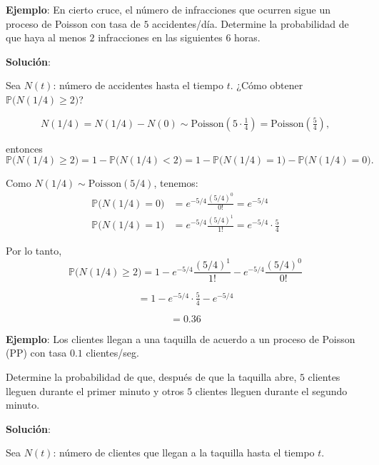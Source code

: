 \documentclass[12pt,a4paper]{article}
\begin{document}
\textbf{Ejemplo}: En cierto cruce, el número de infracciones que ocurren sigue un proceso de Poisson con tasa de $5$ accidentes/día.  
Determine la probabilidad de que haya al menos $2$ infracciones en las siguientes $6$ horas.

\textbf{Solución}:

Sea $N(t)$: número de accidentes hasta el tiempo $t$. ¿Cómo obtener $\mathbb{P}\big(N(1/4) \geq 2\big)$?


\begin{equation*}
N(1/4) = N(1/4) - N(0) \sim \text{Poisson}\!\left( 5 \cdot \tfrac{1}{4} \right) 
= \text{Poisson}\!\left(\tfrac{5}{4}\right),
\end{equation*}

entonces
\begin{equation*}
\mathbb{P}\big(N(1/4) \geq 2\big) 
= 1 - \mathbb{P}\big(N(1/4) < 2\big)
= 1 - \mathbb{P}\big(N(1/4) = 1\big) - \mathbb{P}\big(N(1/4) = 0\big).
\end{equation*}

Como $N(1/4) \sim \text{Poisson}(5/4)$, tenemos:
\begin{align*}
\mathbb{P}\big(N(1/4) = 0\big) &= e^{-5/4} \frac{(5/4)^0}{0!} = e^{-5/4} \\
\mathbb{P}\big(N(1/4) = 1\big) &= e^{-5/4} \frac{(5/4)^1}{1!} = e^{-5/4} \cdot \tfrac{5}{4}
\end{align*}

Por lo tanto,
\begin{equation*}
\mathbb{P}\big(N(1/4) \geq 2\big) 
= 1 - e^{-5/4}\frac{(5/4)^1}{1!} - e^{-5/4}\frac{(5/4)^0}{0!}
\end{equation*}

\begin{equation*}
= 1 - e^{-5/4}\cdot \tfrac{5}{4} - e^{-5/4}
\end{equation*}

\begin{equation*}
= 0.36
\end{equation*}

\textbf{Ejemplo}: Los clientes llegan a una taquilla de acuerdo a un proceso de Poisson (PP) con tasa $0.1$ clientes/seg.  

Determine la probabilidad de que, después de que la taquilla abre, $5$ clientes lleguen durante el primer minuto y otros $5$ clientes lleguen durante el segundo minuto.

\textbf{Solución}:

Sea $N(t)$: número de clientes que llegan a la taquilla hasta el tiempo $t$.
\end{document}
